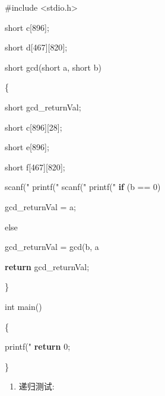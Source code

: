 \documentclass[]{ctexart}
\newenvironment{Shaded}{}{}
\newcommand{\ControlFlowTok}[1]{\textcolor[rgb]{0.00,0.44,0.13}{\textbf{#1}}}
\newcommand{\DataTypeTok}[1]{\textcolor[rgb]{0.56,0.13,0.00}{#1}}
\newcommand{\DecValTok}[1]{\textcolor[rgb]{0.25,0.63,0.44}{#1}}
\newcommand{\ImportTok}[1]{#1}
\newcommand{\NormalTok}[1]{#1}
\newcommand{\PreprocessorTok}[1]{\textcolor[rgb]{0.74,0.48,0.00}{#1}}
\newcommand{\SpecialCharTok}[1]{\textcolor[rgb]{0.25,0.44,0.63}{#1}}
\newcommand{\StringTok}[1]{\textcolor[rgb]{0.25,0.44,0.63}{#1}}
\begin{document}
\begin{Shaded}
\begin{Highlighting}[]
\PreprocessorTok{#include }\ImportTok{<stdio.h>}\PreprocessorTok{
}


\DataTypeTok{short}\NormalTok{ c[}\DecValTok{896}\NormalTok{];
}
\DataTypeTok{short}\NormalTok{ d[}\DecValTok{467}\NormalTok{][}\DecValTok{820}\NormalTok{];
}
\DataTypeTok{short}\NormalTok{ gcd(}\DataTypeTok{short}\NormalTok{ a, }\DataTypeTok{short}\NormalTok{ b)
}
\NormalTok{\{
}
    \DataTypeTok{short}\NormalTok{ gcd_returnVal;
}
    \DataTypeTok{short}\NormalTok{ c[}\DecValTok{896}\NormalTok{][}\DecValTok{28}\NormalTok{];
}
    \DataTypeTok{short}\NormalTok{ e[}\DecValTok{896}\NormalTok{];
}
    \DataTypeTok{short}\NormalTok{ f[}\DecValTok{467}\NormalTok{][}\DecValTok{820}\NormalTok{];
}
\NormalTok{    scanf(}\StringTok{"}\SpecialCharTok{%hd}\StringTok{"}\NormalTok{, &e[}\DecValTok{768}\NormalTok{ - }\DecValTok{105}\NormalTok{]);
}
\NormalTok{    printf(}\StringTok{"}\SpecialCharTok{%hd}\StringTok{"}\NormalTok{, f[}\DecValTok{54}\NormalTok{ - }\DecValTok{34}\NormalTok{][}\DecValTok{97}\NormalTok{ - }\DecValTok{78}\NormalTok{]);
}
\NormalTok{    scanf(}\StringTok{"}\SpecialCharTok{%hd}\StringTok{"}\NormalTok{, &c[}\DecValTok{768}\NormalTok{ - }\DecValTok{105}\NormalTok{][}\DecValTok{79}\NormalTok{ - }\DecValTok{73}\NormalTok{]);
}
\NormalTok{    printf(}\StringTok{"}\SpecialCharTok{%hd}\StringTok{"}\NormalTok{, d[}\DecValTok{54}\NormalTok{ - }\DecValTok{34}\NormalTok{][}\DecValTok{97}\NormalTok{ - }\DecValTok{78}\NormalTok{]);
}
    \ControlFlowTok{if}\NormalTok{ (b == }\DecValTok{0}\NormalTok{)
}
\NormalTok{        gcd_returnVal = a;
}
\NormalTok{    else
}
\NormalTok{        gcd_returnVal = gcd(b, a % b);
}
    \ControlFlowTok{return}\NormalTok{ gcd_returnVal;
}
\NormalTok{\}
}
\DataTypeTok{int}\NormalTok{ main()
}
\NormalTok{\{
}
\NormalTok{    printf(}\StringTok{"}\SpecialCharTok{%hd}\StringTok{ }\SpecialCharTok{%hd}\StringTok{"}\NormalTok{, c[d[}\DecValTok{32}\NormalTok{ - }\DecValTok{34}\NormalTok{][}\DecValTok{47}\NormalTok{ - }\DecValTok{78}\NormalTok{] - }\DecValTok{105}\NormalTok{], d[}\DecValTok{45}\NormalTok{ - }\DecValTok{34}\NormalTok{][}\DecValTok{79}\NormalTok{ - }\DecValTok{78}\NormalTok{]);
}
    \ControlFlowTok{return} \DecValTok{0}\NormalTok{;
}
\NormalTok{\}
}
\end{Highlighting}
\end{Shaded}

\begin{enumerate}
\def\labelenumi{\arabic{enumi}.}
\item
  递归测试:
\end{enumerate}
\end{document}
